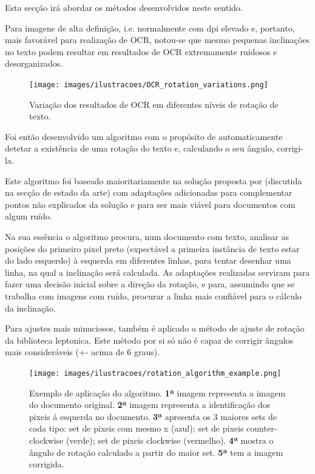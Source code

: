 Esta secção irá abordar os métodos desenvolvidos neste sentido.


\label{contribution_image_rotation_correction}

Para imagens de alta definição, i.e. normalmente com dpi elevado e, portanto, mais favorável para realização de OCR, notou-se que mesmo pequenas inclinações no texto podem resultar em resultados de OCR extremamente ruidosos e desorganizados.

\begin{figure}[H]
	\centering
	\texttt{[image: images/ilustracoes/OCR\_rotation\_variations.png]}
	\caption{Variação dos resultados de OCR em diferentes níveis de rotação de texto.}
	\label{fig:ocr_rotation_variations}
\end{figure}


Foi então desenvolvido um algoritmo com o propósito de automaticamente detetar a existência de uma rotação do texto e, calculando o seu ângulo, corrigi-la. 

Este algoritmo foi baseado maioritariamente na solução proposta por \cite{4283429} (discutida na secção de estado da arte) com adaptações adicionadas para complementar pontos não explicados da solução e para ser mais viável para documentos com algum ruído.

Na sua essência o algoritmo procura, num documento com texto, analisar as posições do primeiro pixel preto (expectável a primeira instância de texto estar do lado esquerdo) à esquerda em diferentes linhas, para tentar desenhar uma linha, na qual a inclinação será calculada. As adaptações realizadas serviram para fazer uma decisão inicial sobre a direção da rotação, e para, assumindo que se trabalha com imagens com ruído, procurar a linha mais confiável para o cálculo da inclinação.

Para ajustes mais minuciosos, também é aplicado o método de ajuste de rotação da biblioteca leptonica. Este método por si só não é capaz de corrigir ângulos mais consideráveis (+- acima de 6 graus).


\begin{figure}[H]
	\centering
	\texttt{[image: images/ilustracoes/rotation\_algorithm\_example.png]}
	\caption{Exemplo de aplicação do algoritmo. 
		\textbf{1ª} imagem representa a imagem do documento original. \textbf{2ª} imagem representa a identificação dos pixeis á esquerda no documento. \textbf{3ª} apresenta os 3 maiores sets de cada tipo: set de pixeis com mesmo x (azul); set de pixeis counter-clockwise (verde); set de pixeis clockwise (vermelho). \textbf{4ª} mostra o ângulo de rotação calculado a partir do maior set. \textbf{5ª} tem a imagem corrigida.}
	\label{fig:rotation_algorithm_example}
\end{figure}


